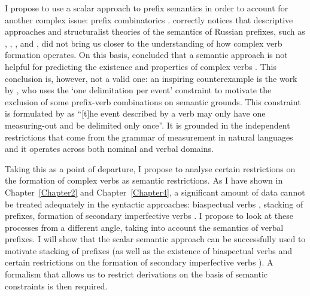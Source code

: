 I propose to use a scalar approach to prefix semantics in order to account for another complex issue: prefix combinatorics . \citet{Tatevosov:09} correctly notices that descriptive approaches and structuralist theories of the semantics of Russian prefixes, such as \citet{Avilova:64}, \citet{Golovin:59}, \citet{Lopatin:97}, and \citet{Tixonov:98}, did not bring us closer to the understanding of how complex verb formation operates. On this basis, \citet{Tatevosov:09} concluded that a semantic approach is not helpful for predicting the existence and properties of complex verbs . This conclusion is, however, not a valid one: an inspiring counterexample is the work by \citet{Filip:03}, who uses the `one delimitation per event' constraint to motivate the exclusion of some prefix-verb combinations on semantic grounds. This constraint is formulated by \citet[79]{Tenny:94} as ``[t]he event described by a verb may only have one measuring-out and be delimited only once''. It is grounded in the independent restrictions that come from the grammar of measurement in natural languages and it operates across both nominal and verbal domains. 

Taking this as a point of departure, I propose to analyse certain restrictions on the formation of complex verbs  as semantic restrictions. As I have shown in Chapter~\ref{Chapter2} and Chapter~\ref{Chapter4}, a significant amount of data cannot be treated adequately in the syntactic approaches: biaspectual verbs , stacking of prefixes, formation of secondary imperfective  verbs . I propose to look at these processes from a different angle, taking into account the semantics of verbal prefixes. I will show that the scalar semantic approach can be successfully used to motivate stacking of prefixes (as well as the existence of biaspectual verbs  and certain restrictions on the formation of secondary imperfective  verbs ). A formalism that allows us to restrict derivations on the basis of semantic constraints is then required. 

